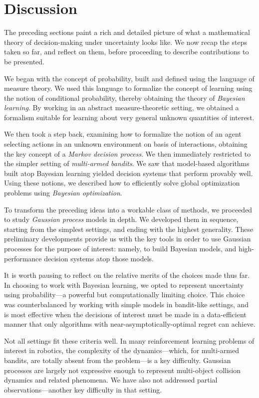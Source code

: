 \documentclass[11pt]{book}
\begin{document}
\section{Discussion}

The preceding sections paint a rich and detailed picture of what a mathematical theory of decision-making under uncertainty looks like.
We now recap the steps taken so far, and reflect on them, before proceeding to describe contributions to be presented.

We began with the concept of probability, built and defined using the language of measure theory. 
We used this language to formalize the concept of learning using the notion of conditional probability, thereby obtaining the theory of \emph{Bayesian learning}.
By working in an abstract measure-theoretic setting, we obtained a formalism suitable for learning about very general unknown quantities of interest.

We then took a step back, examining how to formalize the notion of an agent selecting actions in an unknown environment on basis of interactions, obtaining the key concept of a \emph{Markov decision process}.
We then immediately restricted to the simpler setting of \emph{multi-armed bandits}.
We saw that model-based algorithms built atop Bayesian learning yielded decision systems that perform provably well.
Using these notions, we described how to efficiently solve global optimization problems using \emph{Bayesian optimization}.

To transform the preceding ideas into a workable class of methods, we proceeded to study \emph{Gaussian process} models in depth.
We developed them in sequence, starting from the simplest settings, and ending with the highest generality.
These preliminary developments provide us with the key tools in order to use Gaussian processes for the purpose of interest: namely, to build Bayesian models, and high-performance decision systems atop those models.

It is worth pausing to reflect on the relative merits of the choices made thus far.
In choosing to work with Bayesian learning, we opted to represent uncertainty using probability---a powerful but computationally limiting choice.
This choice was counterbalanced by working with simple models in bandit-like settings, and is most effective when the decisions of interest must be made in a data-efficient manner that only algorithms with near-asymptotically-optimal regret can achieve.

Not all settings fit these criteria well.
In many reinforcement learning problems of interest in robotics, the complexity of the dynamics---which, for multi-armed bandits, are totally absent from the problem---is a key difficulty.
Gaussian processes are largely not expressive enough to represent multi-object collision dynamics and related phenomena.
We have also not addressed partial observations---another key difficulty in that setting.
\end{document}
